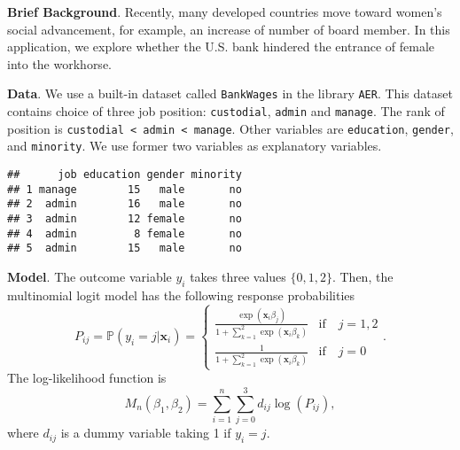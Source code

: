 \documentclass[
  12pt,
]{article}
\newenvironment{Shaded}{\begin{snugshade}}{\end{snugshade}}
\newcommand{\DataTypeTok}[1]{\textcolor[rgb]{0.13,0.29,0.53}{#1}}
\newcommand{\DecValTok}[1]{\textcolor[rgb]{0.00,0.00,0.81}{#1}}
\newcommand{\KeywordTok}[1]{\textcolor[rgb]{0.13,0.29,0.53}{\textbf{#1}}}
\newcommand{\NormalTok}[1]{#1}
\newcommand{\OperatorTok}[1]{\textcolor[rgb]{0.81,0.36,0.00}{\textbf{#1}}}
\newcommand{\StringTok}[1]{\textcolor[rgb]{0.31,0.60,0.02}{#1}}
\begin{document}
\textbf{Brief Background}. Recently, many developed countries move
toward women's social advancement, for example, an increase of number of
board member. In this application, we explore whether the U.S. bank
hindered the entrance of female into the workhorse.

\noindent \textbf{Data}. We use a built-in dataset called
\texttt{BankWages} in the library \texttt{AER}. This dataset contains
choice of three job position: \texttt{custodial}, \texttt{admin} and
\texttt{manage}. The rank of position is
\texttt{custodial\ \textless{}\ admin\ \textless{}\ manage}. Other
variables are \texttt{education}, \texttt{gender}, and
\texttt{minority}. We use former two variables as explanatory variables.

\begin{Shaded}
\end{Shaded}

\begin{verbatim}
##      job education gender minority
## 1 manage        15   male       no
## 2  admin        16   male       no
## 3  admin        12 female       no
## 4  admin         8 female       no
## 5  admin        15   male       no
\end{verbatim}

\noindent \textbf{Model}. The outcome variable \(y_i\) takes three
values \(\{0, 1, 2\}\). Then, the multinomial logit model has the
following response probabilities \begin{equation*}
  P_{ij} = \mathbb{P}(y_i = j | \mathbf{x}_i) =
  \begin{cases}
    \frac{\exp(\mathbf{x}_i \beta_j)}{1 + \sum_{k=1}^2 \exp(\mathbf{x}_i \beta_k)} &\text{if}\quad j = 1, 2  \\
    \frac{1}{1 + \sum_{k=1}^2 \exp(\mathbf{x}_i \beta_k)}  &\text{if}\quad j = 0
  \end{cases}.
\end{equation*} The log-likelihood function is \begin{equation*}
  M_n(\beta_1, \beta_2) = \sum_{i=1}^n \sum_{j=0}^3 d_{ij} \log (P_{ij}),
\end{equation*} where \(d_{ij}\) is a dummy variable taking 1 if
\(y_i = j\).
\end{document}
